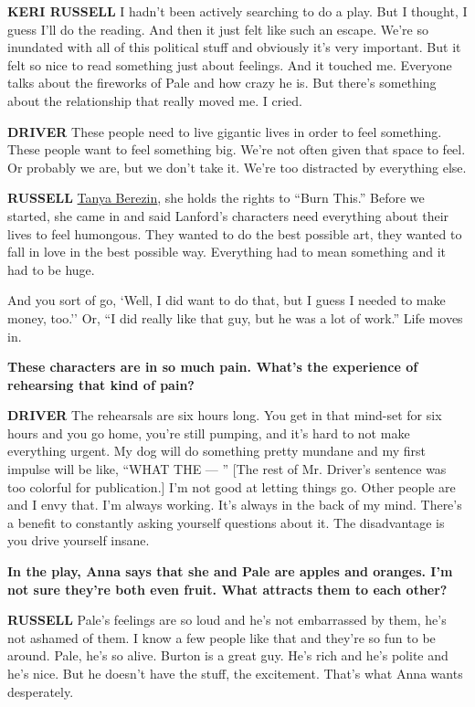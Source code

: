 \textbf{KERI RUSSELL} I hadn't been actively searching to do a play. But
I thought, I guess I'll do the reading. And then it just felt like such
an escape. We're so inundated with all of this political stuff and
obviously it's very important. But it felt so nice to read something
just about feelings. And it touched me. Everyone talks about the
fireworks of Pale and how crazy he is. But there's something about the
relationship that really moved me. I cried.

\textbf{DRIVER} These people need to live gigantic lives in order to
feel something. These people want to feel something big. We're not often
given that space to feel. Or probably we are, but we don't take it.
We're too distracted by everything else.

\textbf{RUSSELL} \href{http://www.tanyaberezin.com/}{Tanya Berezin}, she
holds the rights to ``Burn This.'' Before we started, she came in and
said Lanford's characters need everything about their lives to feel
humongous. They wanted to do the best possible art, they wanted to fall
in love in the best possible way. Everything had to mean something and
it had to be huge.

And you sort of go, `Well, I did want to do that, but I guess I needed
to make money, too.'' Or, ``I did really like that guy, but he was a lot
of work.'' Life moves in.

\textbf{These characters are in so much pain. What's the experience of
rehearsing that kind of pain?}

\textbf{DRIVER} The rehearsals are six hours long. You get in that
mind-set for six hours and you go home, you're still pumping, and it's
hard to not make everything urgent. My dog will do something pretty
mundane and my first impulse will be like, ``WHAT THE --- '' {[}The rest
of Mr. Driver's sentence was too colorful for publication.{]} I'm not
good at letting things go. Other people are and I envy that. I'm always
working. It's always in the back of my mind. There's a benefit to
constantly asking yourself questions about it. The disadvantage is you
drive yourself insane.

\textbf{In the play, Anna says that she and Pale are apples and oranges.
I'm not sure they're both even fruit. What attracts them to each other?}

\textbf{RUSSELL} Pale's feelings are so loud and he's not embarrassed by
them, he's not ashamed of them. I know a few people like that and
they're so fun to be around. Pale, he's so alive. Burton is a great guy.
He's rich and he's polite and he's nice. But he doesn't have the stuff,
the excitement. That's what Anna wants desperately.

